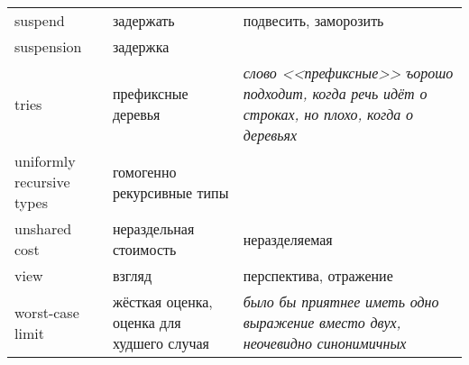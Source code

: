 \documentclass{article}
\begin{document}
\begin{tabular}{p{3cm}|p{4cm}|p{5cm}}
suspend & задержать & подвесить, заморозить \\
suspension & задержка \\
tries & префиксные деревья & \textit{слово <<префиксные>> ъорошо
  подходит, когда речь идёт о строках, но плохо, когда о деревьях} \\
uniformly recursive types & гомогенно рекурсивные типы \\
unshared cost & нераздельная стоимость & неразделяемая \\
view & взгляд & перспектива, отражение \\
worst-case limit & жёсткая оценка, оценка для худшего случая &
\textit{было бы приятнее иметь одно выражение вместо двух, неочевидно
  синонимичных} \\
  
\end{tabular}
\end{document}
